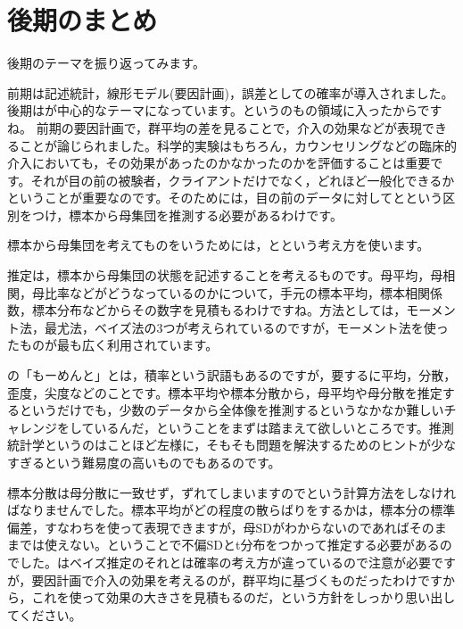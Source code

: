 \documentclass{ltjbook}
\begin{document}
 
\chapter{後期のまとめ}
\label{chapter30} 
後期のテーマを振り返ってみます。

前期は記述統計，線形モデル(要因計画)，誤差としての確率が導入されました。
後期はが中心的なテーマになっています。というのもの領域に入ったからですね。
前期の要因計画で，群平均の差を見ることで，介入の効果などが表現できることが論じられました。科学的実験はもちろん，カウンセリングなどの臨床的介入においても，その効果があったのかなかったのかを評価することは重要です。それが目の前の被験者，クライアントだけでなく，どれほど一般化できるかということが重要なのです。そのためには，目の前のデータに対してとという区別をつけ，標本から母集団を推測する必要があるわけです。

標本から母集団を考えてものをいうためには，とという考え方を使います。

推定は，標本から母集団の状態を記述することを考えるものです。母平均，母相関，母比率などがどうなっているのかについて，手元の標本平均，標本相関係数，標本分布などからその数字を見積もるわけですね。方法としては，モーメント法，最尤法，ベイズ法の3つが考えられているのですが，モーメント法を使ったものが最も広く利用されています。

の「もーめんと」とは，積率という訳語もあるのですが，要するに平均，分散，歪度，尖度などのことです。標本平均や標本分散から，母平均や母分散を推定するというだけでも，少数のデータから全体像を推測するというなかなか難しいチャレンジをしているんだ，ということをまずは踏まえて欲しいところです。推測統計学というのはことほど左様に，そもそも問題を解決するためのヒントが少なすぎるという難易度の高いものでもあるのです。

標本分散は母分散に一致せず，ずれてしまいますのでという計算方法をしなければなりませんでした。標本平均がどの程度の散らばりをするかは，標本分の標準偏差，すなわちを使って表現できますが，母SDがわからないのであればそのままでは使えない。ということで不偏SDとt分布をつかって推定する必要があるのでした。はベイズ推定のそれとは確率の考え方が違っているので注意が必要ですが，要因計画で介入の効果を考えるのが，群平均に基づくものだったわけですから，これを使って効果の大きさを見積もるのだ，という方針をしっかり思い出してください。
\end{document}
